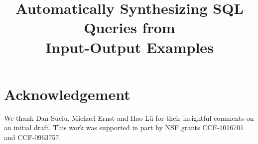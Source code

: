 \documentclass[conference]{IEEEtran}
\begin{document}
\title{Automatically Synthesizing SQL Queries from \\Input-Output Examples}



\author{
}


\maketitle






\vspace{-1mm}


\vspace{-1mm}


\vspace{-1mm}


\vspace{-1mm}


\vspace{-1mm}


\vspace{-1mm}






\vspace{-1mm}

\section{Acknowledgement}

We thank Dan Suciu, Michael Ernst and Hao L{\"u} for their insightful comments
on an initial draft. This
work was supported in part by NSF grants
CCF-1016701 and CCF-0963757.


%
%

%


\end{document}
